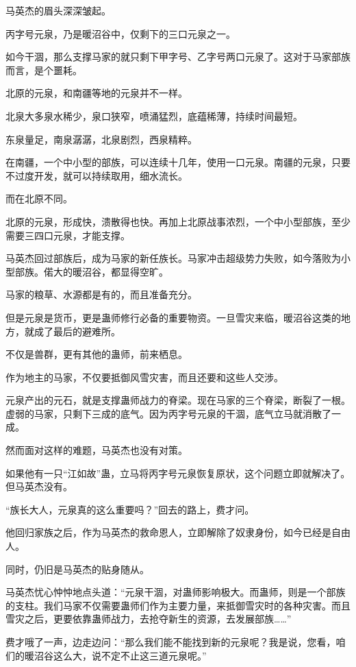 \begin{this_body}
马英杰的眉头深深皱起。

丙字号元泉，乃是暖沼谷中，仅剩下的三口元泉之一。

如今干涸，那么支撑马家的就只剩下甲字号、乙字号两口元泉了。这对于马家部族而言，是个噩耗。

北原的元泉，和南疆等地的元泉并不一样。

北泉大多泉水稀少，泉口狭窄，喷涌猛烈，底蕴稀薄，持续时间最短。

东泉量足，南泉潺潺，北泉剧烈，西泉精粹。

在南疆，一个中小型的部族，可以连续十几年，使用一口元泉。南疆的元泉，只要不过度开发，就可以持续取用，细水流长。

而在北原不同。

北原的元泉，形成快，溃散得也快。再加上北原战事浓烈，一个中小型部族，至少需要三四口元泉，才能支撑。

马英杰回过部族后，成为马家的新任族长。马家冲击超级势力失败，如今落败为小型部族。偌大的暖沼谷，都显得空旷。

马家的粮草、水源都是有的，而且准备充分。

但是元泉是货币，更是蛊师修行必备的重要物资。一旦雪灾来临，暖沼谷这类的地方，就成了最后的避难所。

不仅是兽群，更有其他的蛊师，前来栖息。

作为地主的马家，不仅要抵御风雪灾害，而且还要和这些人交涉。

元泉产出的元石，就是支撑蛊师战力的脊梁。现在马家的三个脊梁，断裂了一根。虚弱的马家，只剩下三成的底气。因为丙字号元泉的干涸，底气立马就消散了一成。

然而面对这样的难题，马英杰也没有对策。

如果他有一只“江如故”蛊，立马将丙字号元泉恢复原状，这个问题立即就解决了。但马英杰没有。

“族长大人，元泉真的这么重要吗？”回去的路上，费才问。

他回归家族之后，作为马英杰的救命恩人，立即解除了奴隶身份，如今已经是自由人。

同时，仍旧是马英杰的贴身随从。

马英杰忧心忡忡地点头道：“元泉干涸，对蛊师影响极大。而蛊师，则是一个部族的支柱。我们马家不仅需要蛊师们作为主要力量，来抵御雪灾时的各种灾害。而且雪灾之后，更要依靠蛊师战力，去抢夺新生的资源，去发展部族……”

费才哦了一声，边走边问：“那么我们能不能找到新的元泉呢？我是说，您看，咱们的暖沼谷这么大，说不定不止这三道元泉呢。”


\end{this_body}
